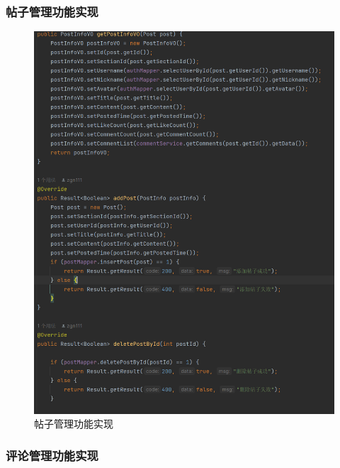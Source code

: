 \documentclass[UTF8]{ctexart}
\begin{document}
\subsubsection{帖子管理功能实现}

\begin{figure}[H]
  \centering
  \includegraphics[scale=0.3]{系统实现/帖子功能实现.png}
  \caption{帖子管理功能实现}
\end{figure}

\subsubsection{评论管理功能实现}
\end{document}
